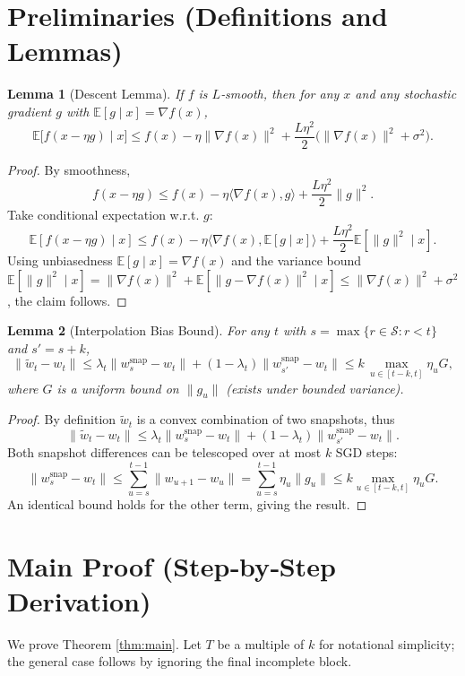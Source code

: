 \documentclass{article}
\newtheorem{lemma}{Lemma}
\newcommand{\E}{\mathbb{E}}
\begin{document}
\section*{Preliminaries (Definitions and Lemmas)}
\begin{lemma}[Descent Lemma]\label{lem:descent}
If $f$ is $L$‑smooth, then for any $x$ and any stochastic gradient $g$ with $\E[g\mid x]=\nabla f(x)$,
\[
    \E\big[f(x-\eta g)\mid x\big]\le f(x)-\eta\|\nabla f(x)\|^{2}+\frac{L\eta^{2}}{2}\big(\|\nabla f(x)\|^{2}+\sigma^{2}\big).
\]
\end{lemma}
\begin{proof}
By smoothness,
\[
f(x-\eta g)\le f(x)-\eta\langle\nabla f(x),g\rangle+\frac{L\eta^{2}}{2}\|g\|^{2}.
\]
Take conditional expectation w.r.t. $g$:
\[
\E[f(x-\eta g)\mid x]\le f(x)-\eta\langle\nabla f(x),\E[g\mid x]\rangle
      +\frac{L\eta^{2}}{2}\E[\|g\|^{2}\mid x].
\]
Using unbiasedness $\E[g\mid x]=\nabla f(x)$ and the variance bound
$\E[\|g\|^{2}\mid x]=\|\nabla f(x)\|^{2}+\E[\|g-\nabla f(x)\|^{2}\mid x]\le \|\nabla f(x)\|^{2}+\sigma^{2}$,
the claim follows. \qedhere
\end{proof}

\begin{lemma}[Interpolation Bias Bound]\label{lem:interp}
For any $t$ with $s=\max\{r\in\mathcal{S}:r<t\}$ and $s'=s+k$,
\[
    \|\tilde w_t-w_t\|\le \lambda_t\|w^{\mathrm{snap}}_{s}-w_t\|+(1-\lambda_t)\|w^{\mathrm{snap}}_{s'}-w_t\|
    \le k\,\max_{u\in[t-k,t]}\eta_u G,
\]
where $G$ is a uniform bound on $\|g_u\|$ (exists under bounded variance).
\end{lemma}
\begin{proof}
By definition $\tilde w_t$ is a convex combination of two snapshots, thus
\[
\|\tilde w_t-w_t\|\le \lambda_t\|w^{\mathrm{snap}}_{s}-w_t\|+(1-\lambda_t)\|w^{\mathrm{snap}}_{s'}-w_t\|.
\]
Both snapshot differences can be telescoped over at most $k$ SGD steps:
\[
\|w^{\mathrm{snap}}_{s}-w_t\|\le\sum_{u=s}^{t-1}\|w_{u+1}-w_u\|
    =\sum_{u=s}^{t-1}\eta_u\|g_u\|\le k\max_{u\in[t-k,t]}\eta_u G.
\]
An identical bound holds for the other term, giving the result. \qedhere
\end{proof}

\section*{Main Proof (Step‑by‑Step Derivation)}
We prove Theorem \ref{thm:main}. Let $T$ be a multiple of $k$ for notational simplicity; the general case follows by ignoring the final incomplete block.
\end{document}
